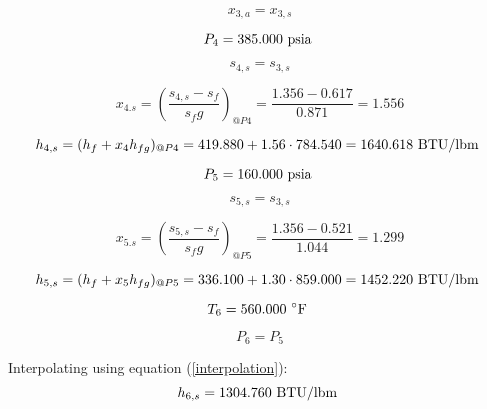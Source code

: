\documentclass{article}
\begin{document}
\begin{equation}
x_{ 3,a} = x_{ 3,s}
\end{equation}

\begin{equation}
P_{ 4} =  385.000\textnormal{ psia                      }
\end{equation}

\begin{equation}
s_{ 4,s} = s_{ 3,s}
\end{equation}

\begin{equation}
x_{ 4.s} = (\frac{s_{ 4,s} - s_{f}}{s_fg})_{@P 4} = \frac{   1.356 -    0.617}{   0.871} =    1.556
\end{equation}

\begin{equation}
  h_{ 4,s} = (h_{f} + x_{ 4}h_{fg})_{@P 4} =  419.880 + 1.56\cdot 784.540 = 1640.618
\textnormal{ BTU/lbm                   }
\end{equation}

\begin{equation}
P_{ 5} =  160.000\textnormal{ psia                      }
\end{equation}

\begin{equation}
s_{ 5,s} = s_{ 3,s}
\end{equation}

\begin{equation}
x_{ 5.s} = (\frac{s_{ 5,s} - s_{f}}{s_fg})_{@P 5} = \frac{   1.356 -    0.521}{   1.044} =    1.299
\end{equation}

\begin{equation}
  h_{ 5,s} = (h_{f} + x_{ 5}h_{fg})_{@P 5} =  336.100 + 1.30\cdot 859.000 = 1452.220
\textnormal{ BTU/lbm                   }
\end{equation}

\begin{equation}
T_{ 6} =  560.000\textnormal{ \(^{\circ}\)F             }
\end{equation}

\begin{equation}
P_{ 6} = P_{ 5}
\end{equation}

Interpolating using equation (\ref{interpolation}):
\begin{equation}
  h_{ 6,s} = 1304.760\textnormal{ BTU/lbm                   }
\end{equation}
\end{document}
